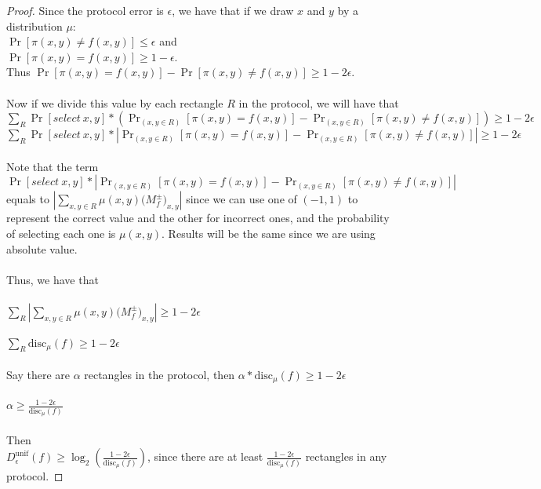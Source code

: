 \documentclass[11pt,oneside]{book}
\theoremstyle{plain}
\theoremstyle{definition}
\theoremstyle{plain}
\newcommand{\disc}{\mathrm{disc}}
\begin{document}
\begin{proof}
	Since the protocol error is $\epsilon$, we have that if we draw  $x$ and $y$ by a distribution $\mu$: \\
	$\Pr[ \pi(x,y) \neq f(x,y)] \le \epsilon$ and\\
	$\Pr[ \pi(x,y) = f(x,y)] \ge 1-\epsilon$. \\
	Thus $\Pr[ \pi(x,y) = f(x,y)] - \Pr[ \pi(x,y) \neq f(x,y)] \ge 1-2\epsilon$. \\
	\\
	Now if we divide this value by each rectangle $R$ in the protocol, we will have that \\
	$\sum_{R} \Pr[select\ x,y] * (\Pr_{(x,y \in R)}[ \pi(x,y) = f(x,y)] - \Pr_{(x,y \in R)}[ \pi(x,y) \neq f(x,y)]) \ge 1-2\epsilon$ \\
	$\sum_{R} \Pr[select\ x,y] * |\Pr_{(x,y \in R)}[ \pi(x,y) = f(x,y)] - \Pr_{(x,y \in R)}[ \pi(x,y) \neq f(x,y)]| \ge 1-2\epsilon$ \\
	\\
	Note that the term  $\Pr[select\ x,y] * |\Pr_{(x,y \in R)}[ \pi(x,y) = f(x,y)] - \Pr_{(x,y \in R)}[ \pi(x,y) \neq f(x,y)]|$ equals to ${\left| \sum_{x,y \in R} \mu(x,y)\big(M^{\pm}_f\big)_{x,y} \right|}$ since we can use one of $(-1,1)$ to represent the correct value and the other for incorrect ones, and the probability of selecting each one is $\mu(x,y)$. Results will be the same since we are using absolute value. \\
	\\
	Thus, we have that \\
	\\
	$\sum_{R} {\left| \sum_{x,y \in R} \mu(x,y)\big(M^{\pm}_f\big)_{x,y} \right|} \ge 1-2\epsilon$\\
	\\
	$\sum_{R} \disc_\mu(f) \ge 1-2\epsilon$\\
	\\
	Say there are $\alpha$ rectangles in the protocol, then
	$\alpha * \disc_\mu(f) \ge 1-2\epsilon$ \\ 
	\\
	$\alpha \ge \frac{1-2\epsilon}{\disc_\mu(f)}$ \\
	\\
	Then\\
	$D_\epsilon^{\mathrm{unif}}(f) \ge \log_2 \left( \frac{1-2\epsilon}{\disc_\mu(f)} \right)$, since there are at least $\frac{1-2\epsilon}{\disc_\mu(f)}$ rectangles in any protocol.
\end{proof}
\end{document}
